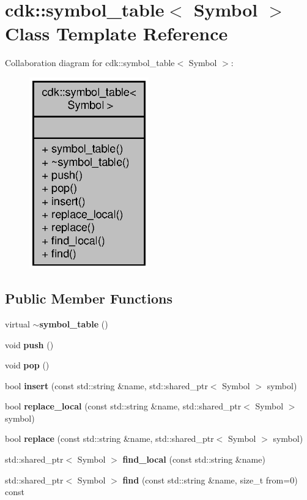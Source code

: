 \section{cdk\+:\+:symbol\+\_\+table$<$ Symbol $>$ Class Template Reference}
\label{classcdk_1_1symbol__table}


Collaboration diagram for cdk\+:\+:symbol\+\_\+table$<$ Symbol $>$\+:
\nopagebreak
\begin{figure}[H]
\begin{center}
\leavevmode
\includegraphics[width=146pt]{classcdk_1_1symbol__table__coll__graph}
\end{center}
\end{figure}
\subsection*{Public Member Functions}
\begin{DoxyCompactItemize}
\item 
virtual \textbf{ $\sim$symbol\+\_\+table} ()
\item 
void \textbf{ push} ()
\item 
void \textbf{ pop} ()
\item 
bool \textbf{ insert} (const std\+::string \&name, std\+::shared\+\_\+ptr$<$ Symbol $>$ symbol)
\item 
bool \textbf{ replace\+\_\+local} (const std\+::string \&name, std\+::shared\+\_\+ptr$<$ Symbol $>$ symbol)
\item 
bool \textbf{ replace} (const std\+::string \&name, std\+::shared\+\_\+ptr$<$ Symbol $>$ symbol)
\item 
std\+::shared\+\_\+ptr$<$ Symbol $>$ \textbf{ find\+\_\+local} (const std\+::string \&name)
\item 
std\+::shared\+\_\+ptr$<$ Symbol $>$ \textbf{ find} (const std\+::string \&name, size\+\_\+t from=0) const
\end{DoxyCompactItemize}


